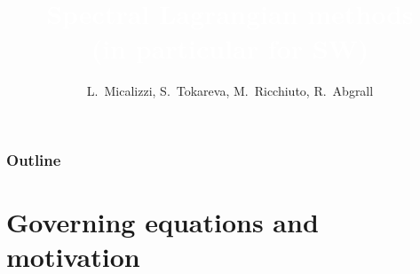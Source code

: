 \documentclass[pt12]{beamer}
\title[]{\textcolor{white}{\bfseries Spectral Lagrangian methods\\ (in particular for SW)}}
\author[Lorenzo Micalizzi] %
{L.~Micalizzi\inst{1,2}, S.~Tokareva\inst{2}, M.~Ricchiuto\inst{3}, R.~Abgrall\inst{1}}
\institute[UZH] %
{
  \inst{1}%
  Institut f{\"u}r Mathematik,\\ 
  Universit{\"a}t Z{\"u}rich
  \and
  \inst{2}%
  Theoretical Division,\\
  Los Alamos National Laboratory
  \and
  \inst{3}%
  Team CARDAMOM,\\
  Inria Bordeaux sud-ouest
}
\date[Los Alamos] %
\begin{document}
\begin{frame}[plain]
\titlepage
\end{frame}



\begin{frame}[label=outline]
\frametitle{Outline}
\tableofcontents%

%
%

\end{frame}

\section{Governing equations and motivation}
\frame\sectionpage





\end{document}
